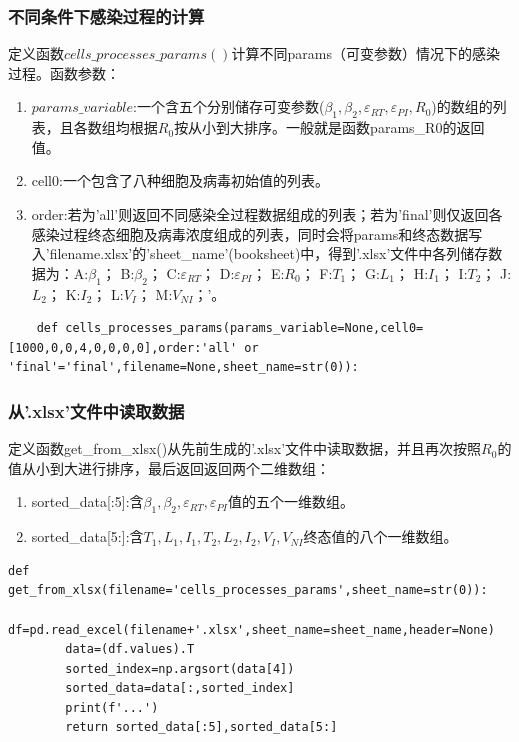 \documentclass{ctexart}
\begin{document}
\subsubsection{不同条件下感染过程的计算}
定义函数$cells\_processes\_params()$计算不同params（可变参数）情况下的感染过程。函数参数：
\begin{enumerate}
    \item $params\_variable$:一个含五个分别储存可变参数($\beta_{1},\beta_{2},\varepsilon _{RT},\varepsilon _{PI},R_{0}$)的数组的列表，且各数组均根据$R_{0}$按从小到大排序。一般就是函数params\_R0的返回值。
    \item cell0:一个包含了八种细胞及病毒初始值的列表。
    \item order:若为'all'则返回不同感染全过程数据组成的列表；若为'final'则仅返回各感染过程终态细胞及病毒浓度组成的列表，同时会将params和终态数据写入'filename.xlsx'的'sheet\_name'(booksheet)中，得到'.xlsx'文件中各列储存数据为：A:$\beta_{1}$； B:$\beta_{2}$； C:$\varepsilon _{RT}$； D:$\varepsilon _{PI}$； E:$R_{0}$； F:$T_{1}$； G:$L_{1}$； H:$I_{1}$； I:$T_{2}$； J:$L_{2}$； K:$I_{2}$； L:$V_{I}$； M:$V_{NI}$；'。
\end{enumerate}
\begin{lstlisting}
    def cells_processes_params(params_variable=None,cell0=[1000,0,0,4,0,0,0,0],order:'all' or 'final'='final',filename=None,sheet_name=str(0)):
\end{lstlisting}

\subsubsection{从'.xlsx'文件中读取数据}
定义函数get\_from\_xlsx()从先前生成的'.xlsx'文件中读取数据，并且再次按照$R_{0}$的值从小到大进行排序，最后返回返回两个二维数组：
\begin{enumerate}
    \item sorted\_data[:5]:含$\beta_{1},\beta_{2},\varepsilon _{RT},\varepsilon _{PI}$值的五个一维数组。
    \item sorted\_data[5:]:含$T_{1},L_{1},I_{1},T_{2},L_{2},I_{2},V_{I},V_{NI}$终态值的八个一维数组。
\end{enumerate}
\begin{lstlisting}[label={lst.6}, caption={读取数据并根据$R_{0}$排序}]
    def get_from_xlsx(filename='cells_processes_params',sheet_name=str(0)):
        df=pd.read_excel(filename+'.xlsx',sheet_name=sheet_name,header=None)
        data=(df.values).T
        sorted_index=np.argsort(data[4])
        sorted_data=data[:,sorted_index]
        print(f'...')
        return sorted_data[:5],sorted_data[5:]
\end{lstlisting}
\end{document}

